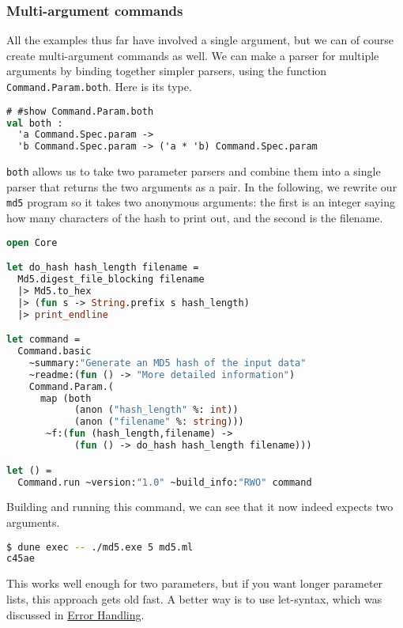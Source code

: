 \hypertarget{multiple-arguments}{%
\subsubsection{Multi-argument commands}\label{multiple-arguments}}

All the examples thus far have involved a single argument, but we can of
course create multi-argument commands as well. We can make a parser for
multiple arguments by binding together simpler parsers, using the
function \passthrough{\lstinline!Command.Param.both!}. Here is its type.

\begin{lstlisting}[language=Caml]
# #show Command.Param.both
val both :
  'a Command.Spec.param ->
  'b Command.Spec.param -> ('a * 'b) Command.Spec.param
\end{lstlisting}

\passthrough{\lstinline!both!} allows us to take two parameter parsers
and combine them into a single parser that returns the two arguments as
a pair. In the following, we rewrite our \passthrough{\lstinline!md5!}
program so it takes two anonymous arguments: the first is an integer
saying how many characters of the hash to print out, and the second is
the filename.

\begin{lstlisting}[language=Caml]
open Core

let do_hash hash_length filename =
  Md5.digest_file_blocking filename
  |> Md5.to_hex
  |> (fun s -> String.prefix s hash_length)
  |> print_endline

let command =
  Command.basic
    ~summary:"Generate an MD5 hash of the input data"
    ~readme:(fun () -> "More detailed information")
    Command.Param.(
      map (both
            (anon ("hash_length" %: int))
            (anon ("filename" %: string)))
       ~f:(fun (hash_length,filename) ->
            (fun () -> do_hash hash_length filename)))

let () =
  Command.run ~version:"1.0" ~build_info:"RWO" command
\end{lstlisting}

Building and running this command, we can see that it now indeed expects
two arguments.

\begin{lstlisting}[language=bash]
$ dune exec -- ./md5.exe 5 md5.ml
c45ae
\end{lstlisting}

This works well enough for two parameters, but if you want longer
parameter lists, this approach gets old fast. A better way is to use
let-syntax, which was discussed in
\href{error-handling.html\#bind-and-other-error-handling-idioms}{Error
Handling}.


